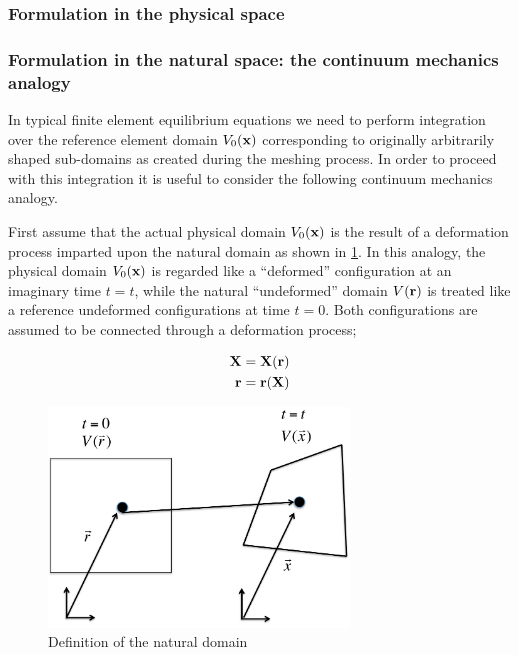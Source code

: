 \subsubsection{Formulation in the physical space}
\subsubsection{Formulation in the natural space: the continuum mechanics analogy}
In typical finite element equilibrium equations we need to perform integration over the reference element domain $V_0(\vb{x})$ corresponding to originally arbitrarily shaped sub-domains as created during the meshing process.  In order to proceed with this integration it is useful to consider the following continuum mechanics analogy.

First assume that the actual physical domain $V_0(\vb{x})$ is the result of a deformation process imparted upon the natural domain as shown in \cref{fig:natural domain}. In this analogy, the physical domain $V_0(\vb{x})$ is regarded like a ``deformed'' configuration at an imaginary time $t=t$, while the natural ``undeformed'' domain $V(\vb{r})$   is treated like a reference undeformed configurations at time $t=0$. Both configurations are assumed to be connected through a deformation process;


\begin{equation}
\begin{aligned}
\vb{X}&=\vb{X}(\vb{r})\\
\vb{r}&=\vb{r}(\vb{X})
\end{aligned}
\label{eq:motion}
\end{equation}

\begin{figure}[h]
\centering
\includegraphics[width=8cm]{figure1.pdf}
\caption{Definition of the natural domain}
\label{fig:natural domain}
\end{figure}

 

